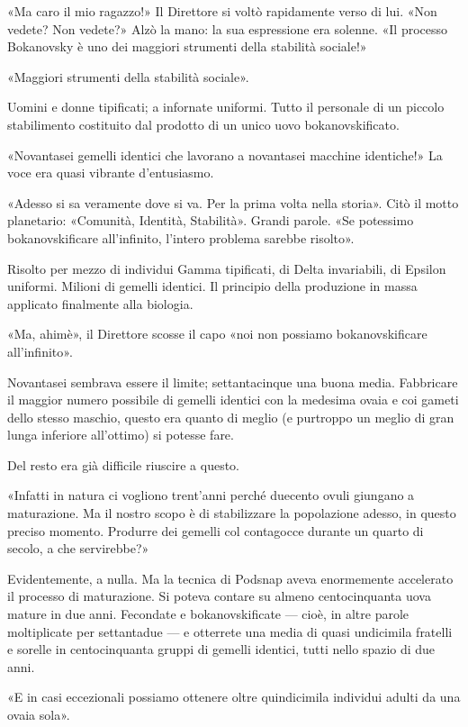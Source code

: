 \documentclass[
a5paper, %
10pt, %
twoside, 
onecolumn, %
openany, %
]{memoir}
\begin{document}
«Ma caro il mio ragazzo!» Il Direttore si voltò rapidamente verso di lui. «Non vedete? Non vedete?» Alzò la mano: la sua espressione era solenne. «Il processo Bokanovsky è uno dei maggiori strumenti della stabilità sociale!»

«Maggiori strumenti della stabilità sociale».

Uomini e donne tipificati; a infornate uniformi. Tutto il personale di un piccolo stabilimento costituito dal prodotto di un unico uovo bokanovskificato.

«Novantasei gemelli identici che lavorano a novantasei macchine identiche!» La voce era quasi vibrante d’entusiasmo.

«Adesso si sa veramente dove si va. Per la prima volta nella storia». Citò il motto planetario: «Comunità, Identità, Stabilità». Grandi parole. «Se potessimo bokanovskificare all’infinito, l’intero problema sarebbe risolto».

Risolto per mezzo di individui Gamma tipificati, di Delta invariabili, di Epsilon uniformi. Milioni di gemelli identici. Il principio della produzione in massa applicato finalmente alla biologia.

«Ma, ahimè», il Direttore scosse il capo «noi non possiamo bokanovskificare all’infinito».

Novantasei sembrava essere il limite; settantacinque una buona media. Fabbricare il maggior numero possibile di gemelli identici con la medesima ovaia e coi gameti dello stesso maschio, questo era quanto di meglio (e purtroppo un meglio di gran lunga inferiore all’ottimo) si potesse fare.

Del resto era già difficile riuscire a questo.

«Infatti in natura ci vogliono trent’anni perché duecento ovuli giungano a maturazione. Ma il nostro scopo è di stabilizzare la popolazione adesso, in questo preciso momento. Produrre dei gemelli col contagocce durante un quarto di secolo, a che servirebbe?»

Evidentemente, a nulla. Ma la tecnica di Podsnap aveva enormemente accelerato il processo di maturazione. Si poteva contare su almeno centocinquanta uova mature in due anni. Fecondate e bokanovskificate — cioè, in altre parole moltiplicate per settantadue — e otterrete una media di quasi undicimila fratelli e sorelle in centocinquanta gruppi di gemelli identici, tutti nello spazio di due anni.

«E in casi eccezionali possiamo ottenere oltre quindicimila individui adulti da una ovaia sola».
\end{document}
